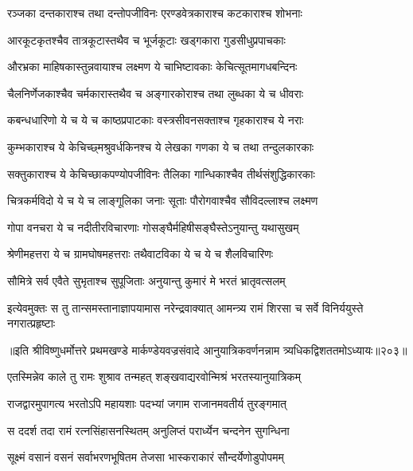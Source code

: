 \twolineshloka
{रञ्जका दन्तकाराश्च तथा दन्तोपजीविनः}
{एरण्डवेत्रकाराश्च कटकाराश्च शोभनाः}%

\twolineshloka
{आरकूटकृतश्चैव तात्रकूटास्तथैव च}
{भूर्जकूटाः खड्गकारा गुडसीधुप्रपाचकाः}%

\twolineshloka
{औरभ्रका माहिषकास्तुन्नवायाश्च लक्ष्मण}
{ये चाभिष्टावकाः केचित्सूतमागधबन्दिनः}%

\twolineshloka
{चैलनिर्णेजकाश्चैव चर्मकारास्तथैव च}
{अङ्गारकोराश्च तथा लुब्धका ये च धीवराः}%

\twolineshloka
{कबन्धधारिणो ये च ये च काष्ठप्रपाटकाः}
{वस्त्रसीवनसक्ताश्च गृहकाराश्च ये नराः}%

\twolineshloka
{कुम्भकाराश्च ये केचिच्छ्मश्रुवर्धकिनश्च ये}
{लेखका गणका ये च तथा तन्दुलकारकाः}%

\twolineshloka
{सक्तुकाराश्च ये केचिच्छाकपण्योपजीविनः}
{तैलिका गान्धिकाश्चैव तीर्थसंशुद्धिकारकाः}%

\twolineshloka
{चित्रकर्मविदो ये च ये च लाङ्गूलिका जनाः}
{सूताः पौरोगवाश्चैव सौविदल्लाश्च लक्ष्मण}%

\twolineshloka
{गोपा वनचरा ये च नदीतीरविचारणाः}
{गोसङ्घैर्महिषीसङ्घैस्तेऽनुयान्तु यथासुखम्}%

\twolineshloka
{श्रेणीमहत्तरा ये च ग्रामघोषमहत्तराः}
{तथैवाटविका ये च ये च शैलविचारिणः}%

\twolineshloka
{सौमित्रे सर्व एवैते सुभृताश्च सुपूजिताः}
{अनुयान्तु कुमारं मे भरतं भ्रातृवत्सलम्}%

\twolineshloka
{इत्येवमुक्तः स तु तान्समस्तानाज्ञापयामास नरेन्द्रवाक्यात्}
{आमन्त्र्य रामं शिरसा च सर्वे विनिर्ययुस्ते नगरात्प्रहृष्टाः}%

॥इति श्रीविष्णुधर्मोत्तरे प्रथमखण्डे मार्कण्डेयवज्रसंवादे आनुयात्रिकवर्णनन्नाम त्र्यधिकद्विशततमोऽध्यायः॥२०३॥



\twolineshloka
{एतस्मिन्नेव काले तु रामः शुश्राव तन्महत्}
{शङ्खवाद्यरवोन्मिश्रं भरतस्यानुयात्रिकम्}%

\twolineshloka
{राजद्वारमुपागत्य भरतोऽपि महायशाः}
{पदभ्यां जगाम राजानमवतीर्य तुरङ्गमात्}%

\twolineshloka
{स ददर्श तदा रामं रत्नसिंहासनस्थितम्}
{अनुलिप्तं परार्ध्येन चन्दनेन सुगन्धिना}%

\twolineshloka
{सूक्ष्मं वसानं वसनं सर्वाभरणभूषितम}
{तेजसा भास्कराकारं सौन्दर्येणोडुपोपमम्}%

